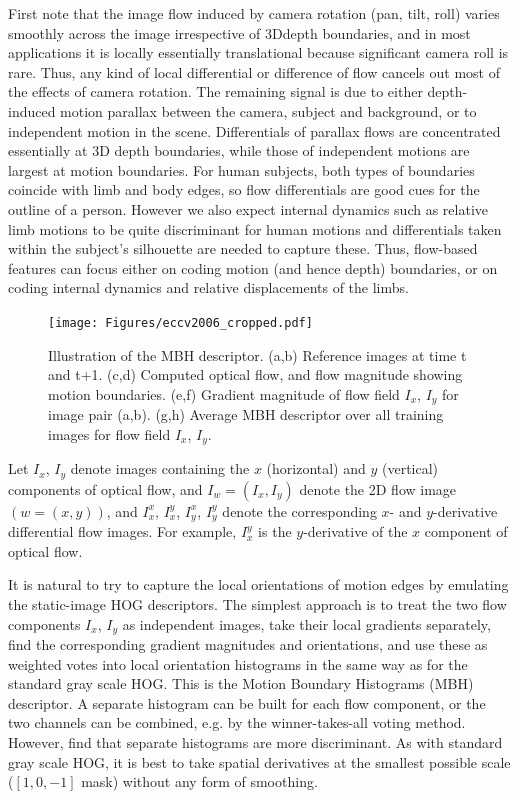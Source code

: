 First note that the image flow induced by camera rotation (pan, tilt, roll) varies smoothly across the image irrespective of 3Ddepth boundaries, and in most applications it is locally essentially translational because significant camera roll is rare. Thus, any kind of local differential or difference of flow cancels out most of the effects of camera rotation. The remaining signal is due to either depth-induced motion parallax between the camera, subject and background, or to independent motion in the scene. Differentials
of parallax flows are concentrated essentially at 3D depth boundaries, while those of independent motions are largest at motion boundaries. For human subjects, both types of boundaries coincide with limb and body edges, so flow differentials are good cues for the outline of a person. However we also expect internal dynamics such as relative limb motions to be quite discriminant for human motions and differentials taken within the subject’s silhouette are needed to capture these. Thus, flow-based features can focus either on coding motion (and hence depth) boundaries, or on coding internal dynamics and relative displacements of the limbs.

\begin{figure}[htbp]
	\centering
		\texttt{[image: Figures/eccv2006\_cropped.pdf]}
	\caption{Illustration of the MBH descriptor. (a,b) Reference images at time t and t+1. (c,d) Computed
optical flow, and flow magnitude showing motion boundaries. (e,f) Gradient magnitude of
flow field $I_x$, $I_y$ for image pair (a,b). (g,h) Average MBH descriptor over all training images for
flow field $I_x$, $I_y$.}
\end{figure}


Let $I_x$, $I_y$ denote images containing the $x$ (horizontal) and $y$ (vertical) components of optical flow, and $I_w = (I_x, I_y)$ denote the 2D flow image $(w = (x, y))$, and $I_x^x$, $I_x^y$, $I_y^x$, $I_y^y$ denote the corresponding $x$- and $y$-derivative differential flow images. For example, $I_x^y$ is the $y$-derivative of the $x$ component of optical flow.

It is natural to try to capture the local orientations of motion edges by emulating the static-image HOG descriptors. The simplest approach is to treat the two flow components $I_x$, $I_y$ as independent images, take their local gradients separately, find the corresponding gradient magnitudes and orientations, and use these as weighted votes into local orientation histograms in the same way as for the standard gray scale HOG. This is the Motion Boundary Histograms (MBH) descriptor. A separate histogram can be built for each flow component, or the two channels can be combined, e.g. by the winner-takes-all voting method. However, \cite{dalal2005histograms} find that separate histograms are more discriminant. As with standard gray scale HOG, it is best to take spatial derivatives at the smallest possible scale ($\left[ 1, 0,-1\right]$ mask) without any form of smoothing.




